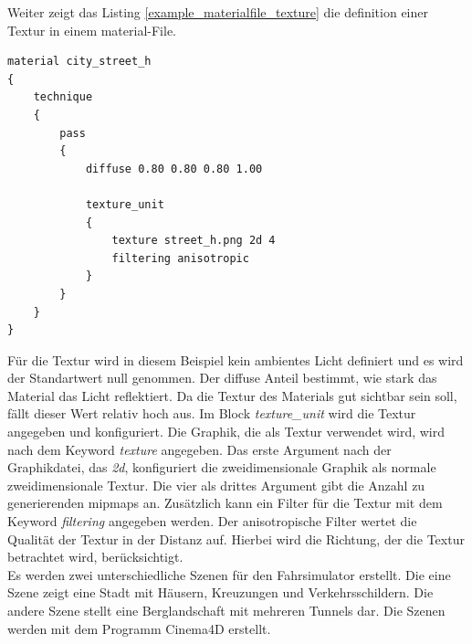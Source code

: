 Weiter zeigt das Listing \ref{example_materialfile_texture} die definition einer Textur in einem material-File.\\
\newpage
\begin{lstlisting}[caption={Beispiel aus dem material-File zur Beschreibung einer Textur},label={example_materialfile_texture}]
material city_street_h
{
	technique
	{
		pass
		{
			diffuse 0.80 0.80 0.80 1.00

			texture_unit
			{
				texture street_h.png 2d 4
				filtering anisotropic
			}
		}
	}
}
\end{lstlisting}
Für die Textur wird in diesem Beispiel kein ambientes Licht definiert und es wird der Standartwert null genommen. Der diffuse Anteil bestimmt, wie stark das Material das Licht reflektiert. Da die Textur des Materials gut sichtbar sein soll, fällt dieser Wert relativ hoch aus. Im Block \textit{texture\_unit} wird die Textur angegeben und konfiguriert. Die Graphik, die als Textur verwendet wird, wird nach dem Keyword \textit{texture} angegeben. Das erste Argument nach der Graphikdatei, das \textit{2d}, konfiguriert die zweidimensionale Graphik als normale zweidimensionale Textur. Die vier als drittes Argument gibt die Anzahl zu generierenden \glspl{mipmap} an. Zusätzlich kann ein Filter für die Textur mit dem Keyword \textit{filtering} angegeben werden. Der anisotropische Filter wertet die Qualität der Textur in der Distanz auf. Hierbei wird die Richtung, der die Textur betrachtet wird, berücksichtigt.\\
Es werden zwei unterschiedliche Szenen für den Fahrsimulator erstellt. Die eine Szene zeigt eine Stadt mit Häusern, Kreuzungen und Verkehrsschildern. Die andere Szene stellt eine Berglandschaft mit mehreren Tunnels dar. Die Szenen werden mit dem Programm Cinema4D erstellt. 
\newpage
